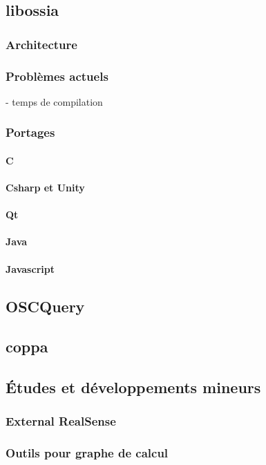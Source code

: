 \documentclass[french,a4paper]{book}
\begin{document}
\subsection{libossia}
\subsubsection{Architecture}
\subsubsection{Problèmes actuels}
- temps de compilation
\subsubsection{Portages}
\paragraph{C}
\paragraph{Csharp et Unity}
\paragraph{Qt}
\paragraph{Java}
\paragraph{Javascript}
\subsection{OSCQuery}
\subsection{coppa}

\subsection{Études et développements mineurs}
\subsubsection{External RealSense}
\subsubsection{Outils pour graphe de calcul}
\end{document}
